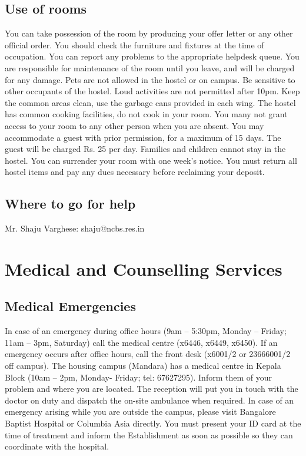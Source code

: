 \documentclass[a4paper]{extarticle}
\begin{document}
\subsection{Use of rooms}
You can take possession of the room by producing your offer letter or any
other official order. You should check the furniture and fixtures at the time of occupation.
You can report any problems to the appropriate helpdesk queue. You are responsible for
maintenance of the room until you leave, and will be charged for any damage. Pets are not
allowed in the hostel or on campus. Be sensitive to other occupants of the hostel. Loud
activities are not permitted after 10pm. Keep the common areas clean, use the garbage cans
provided in each wing. The hostel has common cooking facilities, do not cook in your room.
You many not grant access to your room to any other person when you are absent. You may
accommodate a guest with prior permission, for a maximum of 15 days. The guest will be
charged Rs. 25 per day. Families and children cannot stay in the hostel. You can surrender
your room with one week’s notice. You must return all hostel items and pay any dues
necessary before reclaiming your deposit.

\subsection{Where to go for help}
Mr. Shaju Varghese: shaju@ncbs.res.in

\section{Medical and Counselling Services}

\subsection{Medical Emergencies} In case of an emergency during office hours
(9am – 5:30pm, Monday – Friday; 11am – 3pm, Saturday) call the medical centre
(x6446, x6449, x6450). If an emergency occurs after office hours, call the front
desk (x6001/2 or 23666001/2 off campus).	
The housing campus (Mandara) has a medical centre in Kepala Block (10am –
2pm, Monday- Friday; tel: 67627295). Inform them of your problem and where you are
located. The reception will put you in touch with the doctor on duty and dispatch the on-site
ambulance when required. In case of an emergency arising while you are outside the
campus, please visit Bangalore Baptist Hospital or Columbia Asia directly. You must
present your ID card at the time of treatment and inform the Establishment as soon as
possible so they can coordinate with the hospital.
\end{document}
